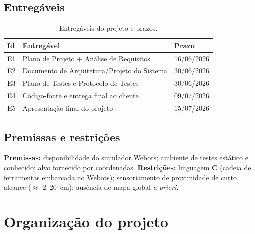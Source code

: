 \subsection{Entregáveis}
\begin{table}[H]\centering
\caption{Entregáveis do projeto e prazos.}
\begin{tabularx}{\textwidth}{@{}l X l@{}}
\toprule
\textbf{Id} & \textbf{Entregável} & \textbf{Prazo} \\
\midrule
E1 & Plano de Projeto + Análise de Requisitos & 16/06/2026 \\
E2 & Documento de Arquitetura/Projeto do Sistema & 30/06/2026 \\
E3 & Plano de Testes e Protocolo de Testes & 30/06/2026 \\
E4 & Código-fonte e entrega final ao cliente & 09/07/2026 \\
E5 & Apresentação final do projeto & 15/07/2026 \\
\bottomrule
\end{tabularx}
\end{table}

\subsection{Premissas e restrições}
\textbf{Premissas:} disponibilidade do simulador Webots; ambiente de testes estático e conhecido; alvo fornecido por coordenadas. \textbf{Restrições:} linguagem \textbf{C} (cadeia de ferramentas embarcada no Webots); sensoriamento de proximidade de curto alcance ($\approx$ 2--20~cm); ausência de mapa global \emph{a priori}.

\section{Organização do projeto}
